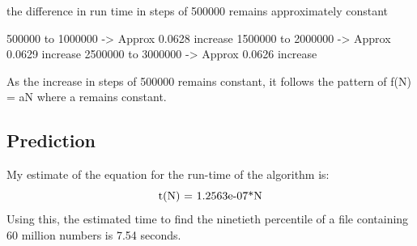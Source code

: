 \documentclass{article}
\begin{document}
the difference in run time in steps of 500000 remains approximately constant

500000 to 1000000 -> Approx 0.0628 increase
1500000 to 2000000 -> Approx 0.0629 increase
2500000 to 3000000 -> Approx 0.0626 increase

As the increase in steps of 500000 remains constant, it follows the pattern
of f(N) = aN where a remains constant.


\subsection{Prediction}
\label{sec:prediction2}

My estimate of the equation for the run-time of the algorithm is:
\begin{equation}
  \label{eq:estimated_runtime2}
  $t(N) = 1.2563e-07*N$
\end{equation}
Using this, the estimated time to find the ninetieth percentile of a
file containing 60 million numbers is 7.54 seconds.
\end{document}
